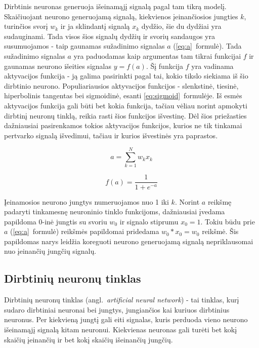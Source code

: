 \documentclass{VUMIFPSbakalaurinis}
\begin{document}
Dirbtinis neuronas generuoja išeinamąjį signalą pagal tam tikrą modelį.
Skaičiuojant neurono generuojamą signalą, kiekvienos įeinančiosios jungties $k$, turinčios svorį $w_k$ ir ja sklindantį signalą $x_k$ dydžio, šie du dydžiai yra sudauginami.
Tada visos šios signalų dydžių ir svorių sandaugos yra susumuojamos - taip gaunamas sužadinimo signalas $a$ (\ref{eq:a}~formulė).
Tada sužadinimo signalas $a$ yra paduodamas kaip argumentas tam tikrai funkcijai $f$ ir gaunamas neurono išeities signalas $y = f(a)$.
Šį funkcija $f$ yra vadinama aktyvacijos funkcija - ją galima pasirinkti pagal tai, kokio tikslo siekiama iš šio dirbtinio neurono.
Populiariausios aktyvacijos funkcijos - slenkstinė, tiesinė, hiperbolinis tangentas bei sigmoidinė, esanti \ref{eq:sigmoid}~formulėje.
Iš esmės aktyvacijos funkcija gali būti bet kokia funkcija, tačiau vėliau norint apmokyti dirbtinį neuronų tinklą, reikia rasti šios funkcijos išvestinę.
Dėl šios priežasties dažniausiai pasirenkamos tokios aktyvacijos funkcijos, kurios ne tik tinkamai pertvarko signalą išvedimui, tačiau ir kurios išvestinės yra paprastos.

\begin{equation} \label{eq:a}
a = \sum_{k=1}^N w_kx_k
\end{equation}

\begin{equation} \label{eq:sigmoid}
f(a) = \frac{1}{1 + e^{-a}}
\end{equation}

Įeinamosios neurono jungtys numeruojamos nuo 1 iki $k$.
Norint $a$ reikšmę padaryti tinkamesnę neuroninio tinklo funkcijoms, dažniausiai įvedama papildoma $0$-inė jungtis su svoriu $w_0$ ir signalo stiprumu $x_0 = 1$.
Tokiu būdu prie $a$ (\ref{eq:a}~formulė) reikšmės papildomai pridedama $w_0 * x_0 = w_0$ reikšmė.
Šis papildomas narys leidžia koreguoti neurono generuojamą signalą nepriklausomai nuo įeinančių jungčių signalų.



\subsection{Dirbtinių neuronų tinklas}

Dirbtinių neuronų tinklas (angl.~\textit{artificial neural network}) - tai tinklas, kurį sudaro dirbtiniai neuronai bei jungtys, jungiančios kai kuriuos dirbtinius neuronus.
Per kiekvieną jungtį gali eiti signalas, kuris perduoda vieno neurono išeinamąjį signalą kitam neuronui.
Kiekvienas neuronas gali turėti bet kokį skaičių įeinančių ir bet kokį skaičių išeinančių jungčių.
\end{document}
